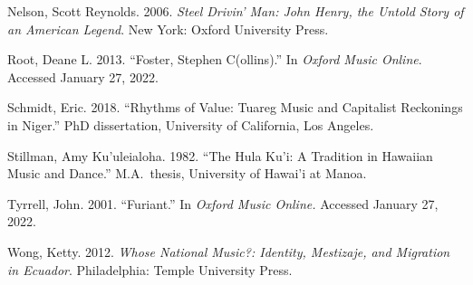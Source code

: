 \documentclass[twoside]{article}
\begin{document}
\begin{hangparas}{15pt}{1}
Nelson, Scott Reynolds. 2006. \emph{Steel Drivin' Man: John
Henry, the Untold Story of an American Legend}. New York: Oxford
University Press.

Root, Deane L. 2013. ``Foster, Stephen C(ollins).'' In
\emph{Oxford Music Online}. Accessed January 27, 2022.~

Schmidt, Eric. 2018. ``Rhythms of Value: Tuareg Music and
Capitalist Reckonings in Niger.'' PhD dissertation, University of
California, Los Angeles.

Stillman, Amy Ku'uleialoha. 1982. ``The Hula Ku'i: A
Tradition in Hawaiian Music and Dance.'' M.A.~thesis, University of
Hawai'i at Manoa.

Tyrrell, John. 2001. ``Furiant.'' In \emph{Oxford Music
Online.} Accessed January 27, 2022.

Wong, Ketty. 2012. \emph{Whose National Music?: Identity,
Mestizaje, and Migration in Ecuador}. Philadelphia: Temple University
Press.

\end{hangparas}
\end{document}
